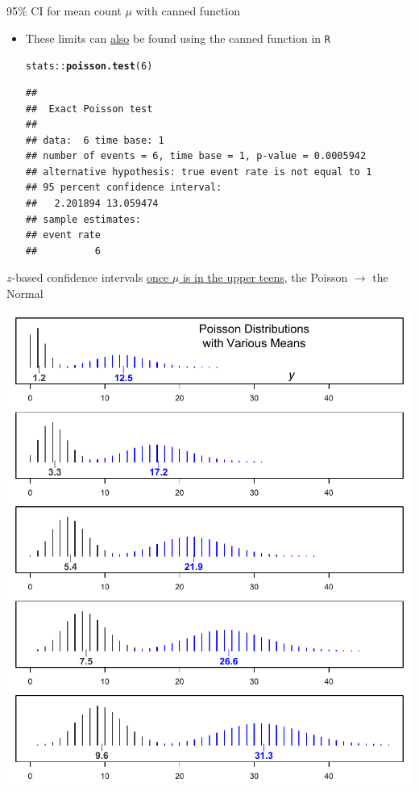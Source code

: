 \documentclass{beamer}\usepackage[]{graphicx}\usepackage[]{color}
\newcommand{\hlnum}[1]{\textcolor[rgb]{0.686,0.059,0.569}{#1}}%
\newcommand{\hlopt}[1]{\textcolor[rgb]{0,0,0}{#1}}%
\newcommand{\hlstd}[1]{\textcolor[rgb]{0.345,0.345,0.345}{#1}}%
\newcommand{\hlkwd}[1]{\textcolor[rgb]{0.737,0.353,0.396}{\textbf{#1}}}%
\newenvironment{knitrout}{}{} %
\begin{document}
\begin{frame}[fragile]{95\% CI for mean count $\mu$ with canned function}
\begin{itemize}
	\setlength\itemsep{1em}
	\item These limits can \underline{also} be found using  the canned function in \texttt{R} 
	
\begin{knitrout}\scriptsize
{}\color{fgcolor}
\begin{alltt}
\hlstd{stats}\hlopt{::}\hlkwd{poisson.test}\hlstd{(}\hlnum{6}\hlstd{)}
\end{alltt}
\begin{verbatim}
## 
## 	Exact Poisson test
## 
## data:  6 time base: 1
## number of events = 6, time base = 1, p-value = 0.0005942
## alternative hypothesis: true event rate is not equal to 1
## 95 percent confidence interval:
##   2.201894 13.059474
## sample estimates:
## event rate 
##          6
\end{verbatim}

\end{knitrout}

\end{itemize}
\end{frame}



\begin{frame}{$z$-based confidence intervals}
\scriptsize
\underline{once $\mu$ is in the upper teens}, the Poisson $\to$ the Normal

\centering
\includegraphics[scale=0.5]{Shapes.pdf}

\end{frame}
\end{document}
